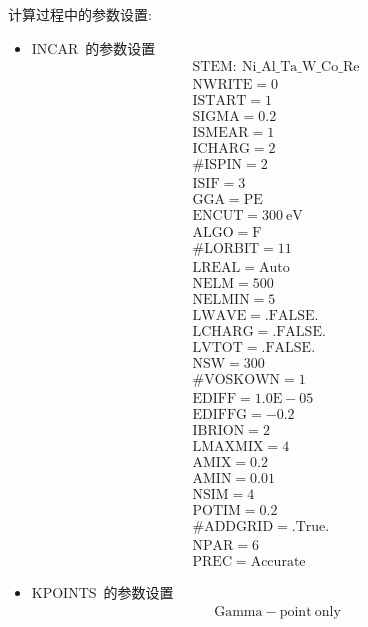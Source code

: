 \documentclass[10pt,a4paper]{article}
\begin{document}
\newpage
计算过程中的参数设置:
\begin{itemize}
	\item \textrm{INCAR~}的参数设置
\begin{displaymath}
\boxed{
	\begin{aligned} 
		&\mathrm{STEM:~Ni\_Al\_Ta\_W\_Co\_Re~} \\
		&\mathrm{NWRITE=0} \\
		&\mathrm{ISTART=1} \\
		&\mathrm{SIGMA=0.2} \\
	&\mathrm{ISMEAR=1} \\
&\mathrm{ICHARG=2} \\
&\mathrm{\#ISPIN=2} \\
&\mathrm{ISIF=3} \\
&\mathrm{GGA=PE} \\
&\mathrm{ENCUT=300~eV} \\
&\mathrm{ALGO= F} \\
&\mathrm{\# LORBIT=11} \\
&\mathrm{LREAL=Auto} \\
&\mathrm{NELM=500} \\
&\mathrm{NELMIN=5} \\
&\mathrm{LWAVE = .FALSE.} \\
&\mathrm{LCHARG = .FALSE.} \\
&\mathrm{LVTOT = .FALSE.} \\
&\mathrm{NSW=300} \\
&\mathrm{\#VOSKOWN=1} \\
&\mathrm{EDIFF=1.0E-05} \\
&\mathrm{EDIFFG=-0.2} \\
&\mathrm{IBRION=2} \\
&\mathrm{LMAXMIX=4} \\
&\mathrm{AMIX=0.2} \\
&\mathrm{AMIN=0.01} \\
&\mathrm{NSIM=4} \\
&\mathrm{POTIM=0.2} \\
&\mathrm{\#ADDGRID= .True.} \\
&\mathrm{NPAR = 6} \\
&\mathrm{PREC=Accurate}
	\end{aligned}}
\end{displaymath}
	\item \textrm{KPOINTS~}的参数设置
\begin{displaymath}
\boxed{
	\begin{aligned}
		&\mathrm{Gamma-point~only}\\

\end{aligned}}
\end{displaymath}
\end{itemize}
\end{document}
